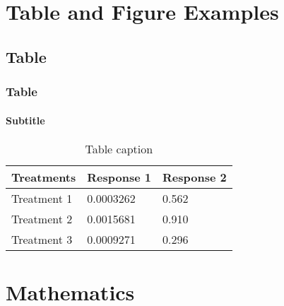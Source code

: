 \documentclass[
	8pt, %
]{beamer}
\begin{document}

\section{Table and Figure Examples}

\subsection{Table}

\begin{frame}
	\frametitle{Table}
	\framesubtitle{Subtitle} %

	\begin{table}
		\begin{tabular}{l l l}
			\toprule
			\textbf{Treatments} & \textbf{Response 1} & \textbf{Response 2}\\
			\midrule
			Treatment 1 & 0.0003262 & 0.562 \\
			Treatment 2 & 0.0015681 & 0.910 \\
			Treatment 3 & 0.0009271 & 0.296 \\
			\bottomrule
		\end{tabular}
		\caption{Table caption}
	\end{table}
\end{frame}


%
%


\section{Mathematics}
\end{document}
